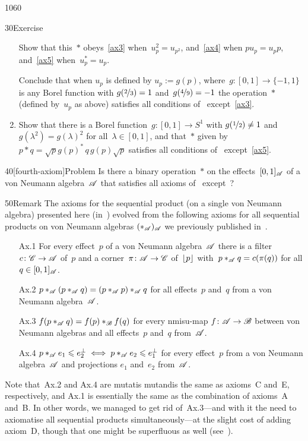 \begin{parsec}{1060}
\begin{point}{30}{Exercise}
\begin{enumerate}
Show that this~$\ast$ obeys~\ref{ax3} when~$u_p^2=u_{p^2}$,
and~\ref{ax4} when $pu_p=u_p p$,
and~\ref{ax5} when~$u_p^*=u_p$.

Conclude that when $u_p$ is defined by $u_p:=g(p)$,
where~$g\colon [0,1]\to\{-1,1\}$
is any Borel function with $g(\nicefrac{2}{3})=1$
and~$g(\nicefrac{4}{9})=-1$
the operation~$\ast$ (defined by~$u_p$ as above) satisfies
all conditions of~ except~\ref{ax3}.
\item
Show that there is a Borel
function~$g\colon[0,1]\to S^1$
with $g(\nicefrac{1}{2})\neq 1$
and~$g(\lambda^2)=g(\lambda)^2$ for all~$\lambda\in [0,1]$,
and that~$\ast$ given by~$p\ast q = \sqrt{p} g(p)^* \,q \,g(p)\sqrt{p}$
satisfies all conditions of~
except~\ref{ax5}.
\end{enumerate}
\spacingfix%
\end{point}%
\begin{point}{40}[fourth-axiom]{Problem}%
Is there a binary operation~$\ast$
on the effects~$[0,1]_{\mathscr{A}}$
of a von Neumann algebra~$\mathscr{A}$
that satisfies all axioms of~
except~?
\end{point}
\begin{point}{50}{Remark}%
The axioms for the sequential product
(on a single von Neumann algebra)
presented here (in~)
evolved
from the following axioms for all
sequential products
on von Neumann algebras
$(\ast_{\mathscr{A}})_{\mathscr{A}}$
we previously published in~\cite{westerbaan2016universal}.
\begin{enumerate}
\item[Ax.1]%
For every effect~$p$ of a von Neumann algebra~$\mathscr{A}$
there is a filter $c\colon \mathscr{C}\to\mathscr{A}$ of~$p$
and a corner~$\pi\colon \mathscr{A}\to\mathscr{C}$
		of~$\left\lfloor p\right\rfloor$ with~$p\ast_{\mathscr{A}} q = c(\pi(q))$
		for all $q\in[0,1]_{\mathscr{A}}$.
\item[Ax.2]%
$p\ast_{\mathscr{A}}(p\ast_{\mathscr{A}} q)= (p \ast_{\mathscr{A}} p )\ast_{\mathscr{A}} q$
for all effects~$p$ and~$q$ from a von Neumann algebra~$\mathscr{A}$.
\item[Ax.3]%
$f(p\ast_{\mathscr{A}} q)= f(p)\ast_{\mathscr{B}} f(q)$
for every nmisu-map $f\colon \mathscr{A}\to\mathscr{B}$
between von Neumann algebras
and all effects~$p$ and~$q$ from~$\mathscr{A}$.
\item[Ax.4]%
$p\ast_{\mathscr{A}} e_1 \leqslant e_2^\perp
\iff p\ast_{\mathscr{A}} e_2 \leqslant e_1^\perp$
for every effect~$p$ from a von Neumann algebra~$\mathscr{A}$
and projections $e_1$ and~$e_2$ from~$\mathscr{A}$.
\end{enumerate}
Note that~Ax.2 and Ax.4 are mutatis mutandis 
the same as axioms~C and~E, respectively,
and Ax.1 is essentially the same as the combination 
of axioms~A and~B.
In other words,
we managed to get rid of~Ax.3---and with it
the need to axiomatise all sequential products simultaneously---at
the slight cost of adding axiom~D,
though that one might be superfluous as well
	(see~).


\end{point}
\end{parsec}
